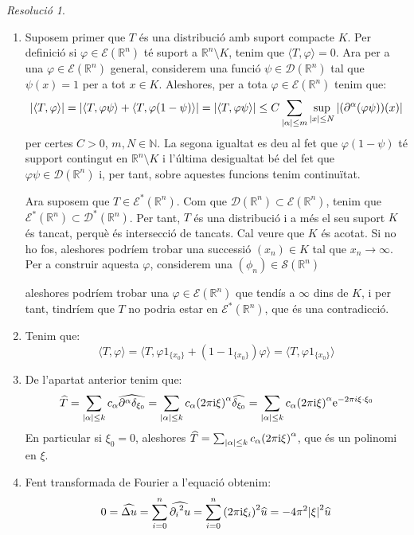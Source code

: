 \documentclass[10pt,a4paper]{article}
\newcommand{\NN}{\ensuremath{\mathbb{N}}} %
\newcommand{\RR}{\ensuremath{\mathbb{R}}} %
\newcommand{\vf}[1]{\boldsymbol{\mathrm{#1}}} %
\newcommand{\ii}{\mathrm{i}} %
\theoremstyle{definition}
\theoremstyle{remark}
\newtheorem*{res}{Resolució}
\renewcommand{\exp}[1]{\mathrm{e}^{#1}} %
\begin{document}
\begin{res}\hfill
  \begin{enumerate}
    \item Suposem primer que $T$ és una distribució amb suport compacte $K$. Per definició si $\varphi\in \mathcal{E}(\RR^n)$ té suport a $\RR^n\setminus K$, tenim que $\langle T,\varphi\rangle =0$. Ara per a una $\varphi\in \mathcal{E}(\RR^n)$ general, considerem una funció $\psi\in \mathcal{D}(\RR^n)$ tal que $\psi(x)=1$ per a tot $x\in K$. Aleshores, per a tota $\varphi\in \mathcal{E}(\RR^n)$ tenim que:
          $$
            \abs{\langle T,\varphi\rangle} = \abs{\langle T,\varphi\psi\rangle + \langle T,\varphi(1-\psi)\rangle} = \abs{\langle T,\varphi\psi\rangle}\leq C \sum_{\abs{\alpha}\leq m}\sup_{\abs{x}\leq N}\abs{(\partial^\alpha(\varphi\psi))(x)}
          $$
          per certes $C>0$, $m,N\in\NN$. La segona igualtat es deu al fet que $\varphi(1-\psi)$ té support contingut en $\RR^n\setminus K$ i l'última desigualtat bé del fet que $\varphi\psi\in\mathcal{D}(\RR^n)$ i, per tant, sobre aquestes funcions tenim continuïtat.

          Ara suposem que $T\in \mathcal{E}^*(\RR^n)$. Com que $\mathcal{D}(\RR^n)\subset \mathcal{E}(\RR^n)$, tenim que $\mathcal{E}^*(\RR^n)\subset \mathcal{D}^*(\RR^n)$. Per tant, $T$ és una distribució i a més el seu suport $K$ és tancat, perquè és intersecció de tancats. Cal veure que $K$ és acotat. Si no ho fos, aleshores podríem trobar una successió $(x_n)\in K$ tal que $x_n\to \infty$.  Per a construir aquesta $\varphi$, considerem una $(\phi_n)\in\mathcal{S}(\RR^n)$

          aleshores podríem trobar una $\varphi\in\mathcal{E}(\RR^n)$ que tendís a $\infty$ dins de $K$, i per tant, tindríem que $T$ no podria estar en $\mathcal{E}^*(\RR^n)$, que és una contradicció.
    \item Tenim que:
          $$
            \langle T,\varphi\rangle = \langle T, \varphi \vf{1}_{\{x_0\}}+(1-  \vf{1}_{\{x_0\}})\varphi\rangle = \langle T, \varphi \vf{1}_{\{x_0\}}\rangle
          $$
    \item De l'apartat anterior tenim que:
          $$
            \widehat{T} = \sum_{\abs{\alpha}\leq k}c_\alpha\widehat{\partial^\alpha\delta_{\xi_0}} = \sum_{\abs{\alpha}\leq k}c_\alpha{(2\pi\ii\xi)}^\alpha\widehat{\delta_{\xi_0}}= \sum_{\abs{\alpha}\leq k}c_\alpha{(2\pi\ii\xi)}^\alpha\exp{-2\pi i \xi\cdot\xi_0}
          $$
          En particular si $\xi_0=0$, aleshores $\widehat{T} = \sum_{\abs{\alpha}\leq k}c_\alpha{(2\pi\ii\xi)}^\alpha$, que és un polinomi en $\xi$.
    \item Fent transformada de Fourier a l'equació obtenim:
          $$
            0=\widehat{\Delta u} =\sum_{i=0}^n \widehat{{\partial_i}^2 u} = \sum_{i=0}^n {(2\pi\ii\xi_i)}^2\widehat{u} = -4\pi^2\abs{\xi}^2\widehat{u}
          $$
  \end{enumerate}
\end{res}
\end{document}
